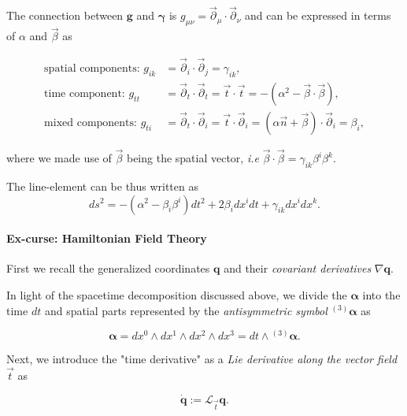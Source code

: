 {    The connection between $\boldsymbol{g}$ and $\boldsymbol{\gamma}$ is $g_{\mu\nu}=\vec{\partial}_{\mu}\cdot\vec{\partial}_{\nu} $ and can be expressed in terms of $\alpha$ and $\vec{\beta}$ as
    
    \begin{align}
    \text{spatial components: } g_{ik}&=\vec{\partial}_{i}\cdot\vec{\partial}_{j} =\gamma_{ik}, \\
    \text{time component: } g_{tt} &= \vec{\partial}_{t}\cdot\vec{\partial}_{t} = \vec{t}\cdot\vec{t} = - (\alpha^2-\vec{\beta}\cdot\vec{\beta}), \\
    \text{mixed components: } g_{ti} &= \vec{\partial}_{t}\cdot\vec{\partial}_{i} = \vec{t}\cdot\vec{\partial}_i = (\alpha\vec{n}+\vec{\beta})\cdot\vec{\partial}_i=\beta_i,
    \end{align}
    
    where we made use of $\vec{\beta}$ being the spatial vector, \textit{i.e} $\vec{\beta}\cdot\vec{\beta}=\gamma_{ik}\beta^i\beta^k$.
    
    The line-element can be thus written as
    \begin{equation}
    ds^2 = -(\alpha^2-\beta_i\beta^i)dt^2 +2\beta_i dx^i dt + \gamma_{ik} dx^i dx^k.
    \end{equation}
    
    
    \paragraph{Ex-curse: Hamiltonian Field Theory}
    
    
    First we recall the generalized coordinates $\boldsymbol{q}$ and their \textit{covariant derivatives} $\nabla\boldsymbol{q}$. 
    
    In light of the spacetime decomposition discussed above, we divide the $\boldsymbol{\alpha}$ into the time $dt$ and spatial parts represented by the \textit{antisymmetric symbol} ${^{(3)}\boldsymbol{\alpha}}$ as 
    
    \begin{equation}
    \boldsymbol{\alpha} = dx^0 \wedge dx^1 \wedge dx^2 \wedge dx^3 = dt \wedge {^{(3)}\boldsymbol{\alpha}}.
    \end{equation}
    
    Next, we introduce the "time derivative" as a \textit{Lie derivative along the vector field} $\vec{t}$ as 
    
    \begin{equation}
    \dot{\boldsymbol{q}} := \mathcal{L}_{\vec{t}}\boldsymbol{q}.
    \end{equation}
    
}
